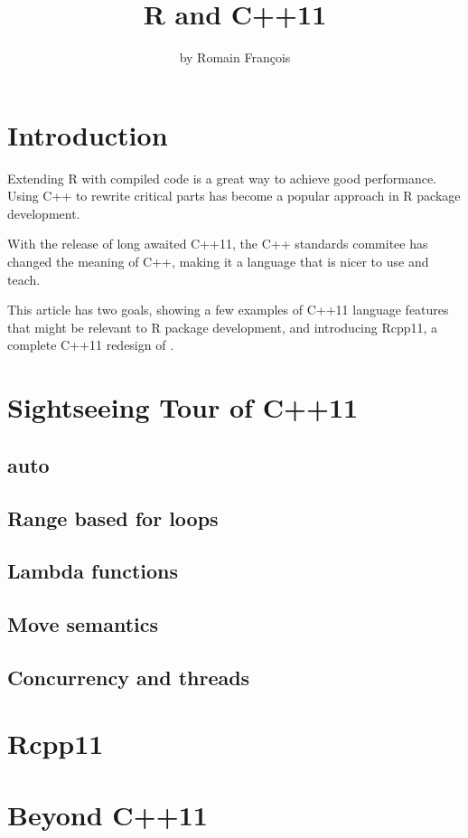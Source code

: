 \title{R and C++11}
\author{by Romain François}

\maketitle

\abstract{}

\section{Introduction}

Extending R with compiled code is a great way to achieve good performance. 
Using C++ to rewrite critical parts has become a popular approach
in R package development. 

With the release of long awaited C++11\citep{Cpp11}, 
the C++ standards commitee has changed the meaning of C++, making it 
a language that is nicer to use and teach. 

This article has two goals, 
showing a few examples of C++11 language features that might be 
relevant to R package development, and introducing
Rcpp11, a complete C++11 redesign of . 

\section{Sightseeing Tour of C++11}

\subsection{auto}
\subsection{Range based for loops}
\subsection{Lambda functions}
\subsection{Move semantics}
\subsection{Concurrency and threads}

\section{Rcpp11}

\section{Beyond C++11}



\address{Romain François\\
    R Enthusiasts\\
    1 place de l'égalité. 42400 Saint Chamond\\
    FRANCE }
    

